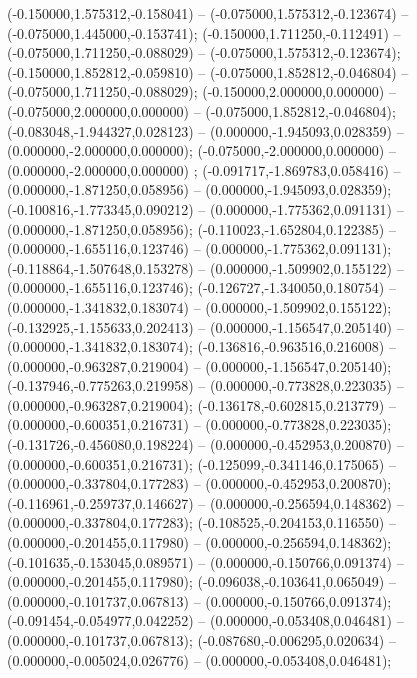  (-0.150000,1.575312,-0.158041) -- (-0.075000,1.575312,-0.123674) -- (-0.075000,1.445000,-0.153741);
 (-0.150000,1.711250,-0.112491) -- (-0.075000,1.711250,-0.088029) -- (-0.075000,1.575312,-0.123674);
 (-0.150000,1.852812,-0.059810) -- (-0.075000,1.852812,-0.046804) -- (-0.075000,1.711250,-0.088029);
 (-0.150000,2.000000,0.000000) -- (-0.075000,2.000000,0.000000) -- (-0.075000,1.852812,-0.046804);
 (-0.083048,-1.944327,0.028123) -- (0.000000,-1.945093,0.028359) -- (0.000000,-2.000000,0.000000);
 (-0.075000,-2.000000,0.000000) -- (0.000000,-2.000000,0.000000) ;
 (-0.091717,-1.869783,0.058416) -- (0.000000,-1.871250,0.058956) -- (0.000000,-1.945093,0.028359);
 (-0.100816,-1.773345,0.090212) -- (0.000000,-1.775362,0.091131) -- (0.000000,-1.871250,0.058956);
 (-0.110023,-1.652804,0.122385) -- (0.000000,-1.655116,0.123746) -- (0.000000,-1.775362,0.091131);
 (-0.118864,-1.507648,0.153278) -- (0.000000,-1.509902,0.155122) -- (0.000000,-1.655116,0.123746);
 (-0.126727,-1.340050,0.180754) -- (0.000000,-1.341832,0.183074) -- (0.000000,-1.509902,0.155122);
 (-0.132925,-1.155633,0.202413) -- (0.000000,-1.156547,0.205140) -- (0.000000,-1.341832,0.183074);
 (-0.136816,-0.963516,0.216008) -- (0.000000,-0.963287,0.219004) -- (0.000000,-1.156547,0.205140);
 (-0.137946,-0.775263,0.219958) -- (0.000000,-0.773828,0.223035) -- (0.000000,-0.963287,0.219004);
 (-0.136178,-0.602815,0.213779) -- (0.000000,-0.600351,0.216731) -- (0.000000,-0.773828,0.223035);
 (-0.131726,-0.456080,0.198224) -- (0.000000,-0.452953,0.200870) -- (0.000000,-0.600351,0.216731);
 (-0.125099,-0.341146,0.175065) -- (0.000000,-0.337804,0.177283) -- (0.000000,-0.452953,0.200870);
 (-0.116961,-0.259737,0.146627) -- (0.000000,-0.256594,0.148362) -- (0.000000,-0.337804,0.177283);
 (-0.108525,-0.204153,0.116550) -- (0.000000,-0.201455,0.117980) -- (0.000000,-0.256594,0.148362);
 (-0.101635,-0.153045,0.089571) -- (0.000000,-0.150766,0.091374) -- (0.000000,-0.201455,0.117980);
 (-0.096038,-0.103641,0.065049) -- (0.000000,-0.101737,0.067813) -- (0.000000,-0.150766,0.091374);
 (-0.091454,-0.054977,0.042252) -- (0.000000,-0.053408,0.046481) -- (0.000000,-0.101737,0.067813);
 (-0.087680,-0.006295,0.020634) -- (0.000000,-0.005024,0.026776) -- (0.000000,-0.053408,0.046481);
